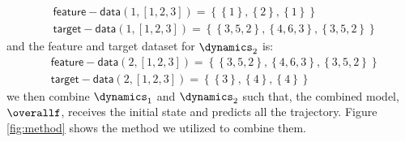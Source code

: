 $$
\begin{aligned}
&\mathsf{feature\!\!-\!\!data}(1,[1,2,3])=\left\{\left\{1\right\},\left\{2\right\},\left\{1\right\} \right\}\\
&\mathsf{target\!\!-\!\!data}(1,[1,2,3])=\left\{ \left\{3,5,2\right\},\left\{4,6,3\right\},\left\{3,5,2\right\} \right\}
\end{aligned}
$$
and the feature and target dataset for $\dynamics_2$ is:
$$
\begin{aligned}
&\mathsf{feature\!\!-\!\!data}(2,[1,2,3])=\left\{ \left\{3,5,2\right\},\left\{4,6,3\right\},\left\{3,5,2\right\} \right\}\\
&\mathsf{target\!\!-\!\!data}(2,[1,2,3])=\left\{\left\{3\right\},\left\{4\right\},\left\{4\right\} \right\}
\end{aligned}
$$
we then combine $\dynamics_1$ and $\dynamics_2$ such that, the combined model, $\overallf$, receives the initial state and predicts all the trajectory. Figure \ref{fig:method} shows the method we utilized to combine them.


